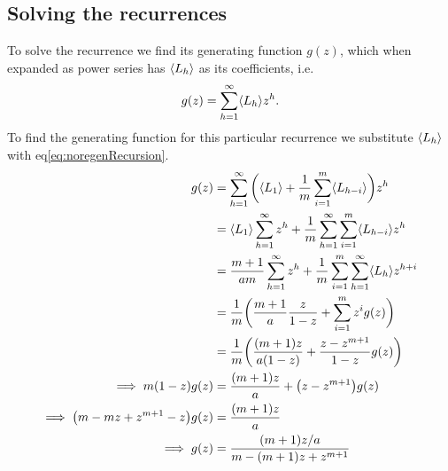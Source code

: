 \subsection{Solving the recurrences}
To solve the recurrence we find its generating function $g(z)$, which when expanded as power series has $\langle L_h \rangle$ as its coefficients, i.e.
\begin{align}
    g(z) = \sum_{h=1}^{\infty} \langle L_h \rangle z^h.
\end{align}
To find the generating function for this particular recurrence we substitute $\langle L_h \rangle$ with eq\ref{eq:noregenRecursion}.
\begin{align}
	g(z)
		&= \sum_{h=1}^\infty\bigg(\langle L_1 \rangle + \frac{1}{m}\sum_{i=1}^m \langle L_{h-i} \rangle\bigg)z^h\nonumber\\
		&= \langle L_1 \rangle\sum_{h=1}^\infty z^h + \frac{1}{m} \sum_{h=1}^\infty\sum_{i=1}^m \langle L_{h-i} \rangle z^h \nonumber\\
		&= \frac{m+1}{am}\sum_{h=1}^\infty z^h + \frac{1}{m} \sum_{i=1}^m\sum_{h=1}^\infty \langle L_h \rangle z^{h+i} \nonumber\\
		&= \frac{1}{m}\bigg(\frac{m+1}{a}\frac{z}{1-z} + \sum_{i=1}^m z^i g(z)\bigg)\nonumber\\
		&= \frac{1}{m}\bigg(\frac{(m+1)z}{a(1-z)} + \frac{z - z^{m+1}}{1-z} g(z)\bigg)\nonumber\\
	\implies m(1-z)g(z) &= \frac{(m+1)z}{a} + \big(z - z^{m+1}\big)g(z)\nonumber\\
	\implies \big(m - mz + z^{m+1} - z\big)g(z) &= \frac{(m+1)z}{a}\nonumber\\
	\implies g(z) &= \frac{(m+1)z/a}{m - (m+1)z + z^{m+1}}\label{eq:ogf}
\end{align}

